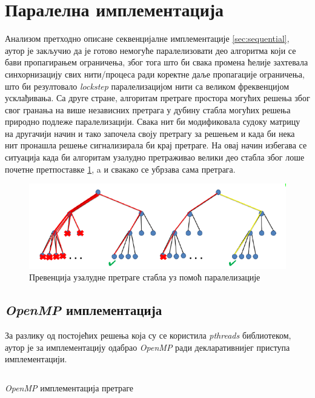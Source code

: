 \section{Паралелна имплементација}\label{sec:parallel}

Анализом претходно описане секвенцијалне имплементације \ref{sec:sequential}, аутор је закључио да је готово немогуће паралелизовати део алгоритма који се бави пропагирањем ограничења, због тога што би свака промена ћелије захтевала синхорнизацију свих нити/процеса ради коректне даље пропагације ограничења, што би резултовало \textit{lockstep} паралелизацијом нити са великом фреквенцијом усклађивања. Са друге стране, алгоритам претраге простора могућих решења због свог  гранања на више независних претрага у дубину стабла могућих решења природно подлеже паралелизацији. Свака нит би модификовала судоку матрицу на другачији начин и тако започела своју претрагу за решењем и када би нека нит пронашла решење сигнализирала би крај претраге. На овај начин избегава се ситуација када би алгоритам узалудно претраживао велики део стабла због лоше почетне претпоставке \ref{fig:search_parallel}, a и свакако се убрзава сама претрага.

\begin{figure}[H]
    \centering
    \includegraphics[width=1\textwidth]{images/search_parallel.png}
    \caption{Превенција узалудне претраге стабла уз помоћ паралелизације}
    \label{fig:search_parallel}
\end{figure}

\subsection{\textit{OpenMP} имплементација}\label{sec:mp_impl}

За разлику од постојећих решења која су се користила \textit{pthreads} \cite{pthreads} библиотеком, аутор је за имплементацију одабрао \textit{OpenMP} \cite{open_mp} ради декларативнијег приступа имплементацији.


\begin{listing}[H]
\inputminted{c}{kodovi/mp_search.c}
\caption{\textit{OpenMP} имплементација претраге}
\label{code:mp_search}
\end{listing}

